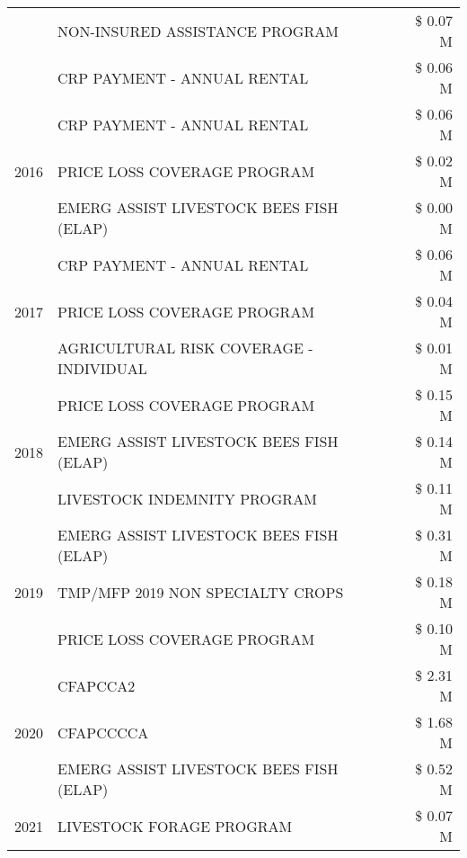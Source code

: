 \begin{tabular}{llr}
 & NON-INSURED ASSISTANCE PROGRAM & \$ 0.07 M \\
 & CRP PAYMENT - ANNUAL RENTAL & \$ 0.06 M \\
\cline{1-3}
\multirow[t]{3}{*}{2016} & CRP PAYMENT - ANNUAL RENTAL & \$ 0.06 M \\
 & PRICE LOSS COVERAGE PROGRAM & \$ 0.02 M \\
 & EMERG ASSIST LIVESTOCK BEES FISH (ELAP) & \$ 0.00 M \\
\cline{1-3}
\multirow[t]{3}{*}{2017} & CRP PAYMENT - ANNUAL RENTAL & \$ 0.06 M \\
 & PRICE LOSS COVERAGE PROGRAM & \$ 0.04 M \\
 & AGRICULTURAL RISK COVERAGE - INDIVIDUAL & \$ 0.01 M \\
\cline{1-3}
\multirow[t]{3}{*}{2018} & PRICE LOSS COVERAGE PROGRAM & \$ 0.15 M \\
 & EMERG ASSIST LIVESTOCK BEES FISH (ELAP) & \$ 0.14 M \\
 & LIVESTOCK INDEMNITY PROGRAM & \$ 0.11 M \\
\cline{1-3}
\multirow[t]{3}{*}{2019} & EMERG ASSIST LIVESTOCK BEES FISH (ELAP) & \$ 0.31 M \\
 & TMP/MFP 2019 NON SPECIALTY CROPS & \$ 0.18 M \\
 & PRICE LOSS COVERAGE PROGRAM & \$ 0.10 M \\
\cline{1-3}
\multirow[t]{3}{*}{2020} & CFAPCCA2 & \$ 2.31 M \\
 & CFAPCCCCA & \$ 1.68 M \\
 & EMERG ASSIST LIVESTOCK BEES FISH (ELAP) & \$ 0.52 M \\
\cline{1-3}
2021 & LIVESTOCK FORAGE PROGRAM & \$ 0.07 M \\
\cline{1-3}
\bottomrule
\end{tabular}
